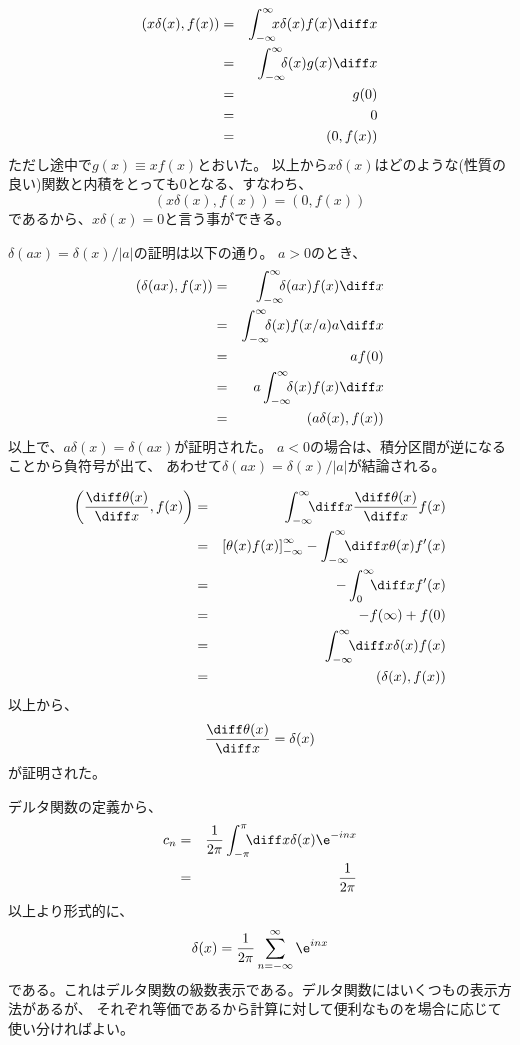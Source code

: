 \begin{eqnarray}
  (x \delta(x), f(x) ) &= &\int_{-\infty}^\infty \!\!\! x \delta(x) f(x) \diff x \\
  &=& \int_{-\infty}^\infty \!\!\! \delta(x) g(x) \diff x \\
  &=& g(0) \\
  &=& 0 \\
  &=& (0, f(x))
\end{eqnarray}
ただし途中で$g(x) \equiv x f(x)$とおいた。
以上から$ x \delta(x)$はどのような(性質の良い)関数と内積をとっても$0$となる、すなわち、
\begin{equation}
  (x \delta(x), f(x)) = (0, f(x))
\end{equation}
であるから、$x \delta(x) = 0$と言う事ができる。

$ \delta(ax) = \delta(x)/|a|$の証明は以下の通り。
$a > 0 $のとき、
\begin{eqnarray}
  (\delta(ax),f(x)) &=& \int_{-\infty}^\infty \!\!\! \delta(ax) f(x) \diff x \\
  &=& \int_{-\infty}^\infty \!\!\! \delta(x) f(x/a) a \diff x\\
  &=& a f(0) \\
  &=& a \int_{-\infty}^\infty \!\!\! \delta(x) f(x) \diff x\\
  &=& (a \delta(x), f(x))
\end{eqnarray}
以上で、$a\delta(x) = \delta(ax)$が証明された。
$a<0$の場合は、積分区間が逆になることから負符号が出て、
あわせて$ \delta(ax) = \delta(x)/|a|$が結論される。

\begin{eqnarray}
  \left(  \frac{\diff \theta(x)}{\diff x} ,f(x) \right)
  &=& \int_{-\infty}^\infty \!\!\! \diff x \frac{\diff \theta(x)}{\diff x} f(x) \\
  &=&
  \left[
    \theta(x) f(x)
    \right]_{-\infty}^{\infty}
  - \int_{-\infty}^\infty \!\!\! \diff x \theta(x) f'(x)\\
  &=& - \int_{0}^\infty \!\!\! \diff xf'(x)\\
  &=& - f(\infty) + f(0)\\
  &=& \int_{-\infty}^\infty \!\!\! \diff x \delta(x) f(x)\\
  &=& (\delta(x), f(x))
\end{eqnarray}
以上から、
$$
  \displaystyle\frac{\diff \theta(x)}{\diff x} = \delta(x)
$$
が証明された。

デルタ関数の定義から、
\begin{eqnarray}
  c_n &=& \frac{1}{2\pi} \int_{-\pi}^{\pi} \!\!\! \diff x \delta(x) \e^{-inx} \\
  &=& \frac{1}{2\pi}
\end{eqnarray}
以上より形式的に、
\begin{equation}
  \delta(x) = \frac{1}{2\pi} \sum_{n=-\infty}^{\infty} \e^{inx}
\end{equation}
である。これはデルタ関数の級数表示である。デルタ関数にはいくつもの表示方法があるが、
それぞれ等価であるから計算に対して便利なものを場合に応じて使い分ければよい。

